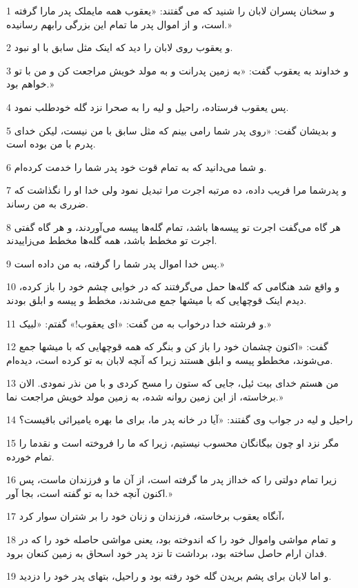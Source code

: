 \par 1 و سخنان پسران لابان را شنید که می گفتند: «یعقوب همه مایملک پدر مارا گرفته است، و از اموال پدر ما تمام این بزرگی رابهم رسانیده.»
\par 2 و یعقوب روی لابان را دید که اینک مثل سابق با او نبود.
\par 3 و خداوند به یعقوب گفت: «به زمین پدرانت و به مولد خویش مراجعت کن و من با تو خواهم بود.»
\par 4 پس یعقوب فرستاده، راحیل و لیه را به صحرا نزد گله خودطلب نمود.
\par 5 و بدیشان گفت: «روی پدر شما رامی بینم که مثل سابق با من نیست، لیکن خدای پدرم با من بوده است.
\par 6 و شما می‌دانید که به تمام قوت خود پدر شما را خدمت کرده‌ام.
\par 7 و پدرشما مرا فریب داده، ده مرتبه اجرت مرا تبدیل نمود ولی خدا او را نگذاشت که ضرری به من رساند.
\par 8 هر گاه می‌گفت اجرت تو پیسه‌ها باشد، تمام گله‌ها پیسه می‌آوردند، و هر گاه گفتی اجرت تو مخطط باشد، همه گله‌ها مخطط می‌زاییدند.
\par 9 پس خدا اموال پدر شما را گرفته، به من داده است.»
\par 10 و واقع شد هنگامی که گله‌ها حمل می‌گرفتند که در خوابی چشم خود را باز کرده، دیدم اینک قوچهایی که با میشها جمع می‌شدند، مخطط و پیسه و ابلق بودند.
\par 11 و فرشته خدا درخواب به من گفت: «ای یعقوب!» گفتم: «لبیک.»
\par 12 گفت: «اکنون چشمان خود را باز کن و بنگر که همه قوچهایی که با میشها جمع می‌شوند، مخططو پیسه و ابلق هستند زیرا که آنچه لابان به تو کرده است، دیده‌ام.
\par 13 من هستم خدای بیت ئیل، جایی که ستون را مسح کردی و با من نذر نمودی. الان برخاسته، از این زمین روانه شده، به زمین مولد خویش مراجعت نما.»
\par 14 راحیل و لیه در جواب وی گفتند: «آیا در خانه پدر ما، برای ما بهره یامیراثی باقیست؟
\par 15 مگر نزد او چون بیگانگان محسوب نیستیم، زیرا که ما را فروخته است و نقدما را تمام خورده.
\par 16 زیرا تمام دولتی را که خدااز پدر ما گرفته است، از آن ما و فرزندان ماست، پس اکنون آنچه خدا به تو گفته است، بجا آور.»
\par 17 آنگاه یعقوب برخاسته، فرزندان و زنان خود را بر شتران سوار کرد،
\par 18 و تمام مواشی واموال خود را که اندوخته بود، یعنی مواشی حاصله خود را که در فدان ارام حاصل ساخته بود، برداشت تا نزد پدر خود اسحاق به زمین کنعان برود.
\par 19 و اما لابان برای پشم بریدن گله خود رفته بود و راحیل، بتهای پدر خود را دزدید.

